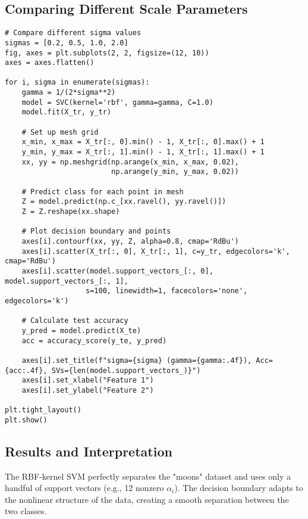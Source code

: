 \documentclass[11pt]{article}
\begin{document}
\subsection{Comparing Different Scale Parameters}
\begin{lstlisting}
# Compare different sigma values
sigmas = [0.2, 0.5, 1.0, 2.0]
fig, axes = plt.subplots(2, 2, figsize=(12, 10))
axes = axes.flatten()

for i, sigma in enumerate(sigmas):
    gamma = 1/(2*sigma**2)
    model = SVC(kernel='rbf', gamma=gamma, C=1.0)
    model.fit(X_tr, y_tr)
    
    # Set up mesh grid
    x_min, x_max = X_tr[:, 0].min() - 1, X_tr[:, 0].max() + 1
    y_min, y_max = X_tr[:, 1].min() - 1, X_tr[:, 1].max() + 1
    xx, yy = np.meshgrid(np.arange(x_min, x_max, 0.02),
                         np.arange(y_min, y_max, 0.02))
    
    # Predict class for each point in mesh
    Z = model.predict(np.c_[xx.ravel(), yy.ravel()])
    Z = Z.reshape(xx.shape)
    
    # Plot decision boundary and points
    axes[i].contourf(xx, yy, Z, alpha=0.8, cmap='RdBu')
    axes[i].scatter(X_tr[:, 0], X_tr[:, 1], c=y_tr, edgecolors='k', cmap='RdBu')
    axes[i].scatter(model.support_vectors_[:, 0], model.support_vectors_[:, 1],
                   s=100, linewidth=1, facecolors='none', edgecolors='k')
    
    # Calculate test accuracy
    y_pred = model.predict(X_te)
    acc = accuracy_score(y_te, y_pred)
    
    axes[i].set_title(f"sigma={sigma} (gamma={gamma:.4f}), Acc={acc:.4f}, SVs={len(model.support_vectors_)}")
    axes[i].set_xlabel("Feature 1")
    axes[i].set_ylabel("Feature 2")

plt.tight_layout()
plt.show()
\end{lstlisting}

\subsection{Results and Interpretation}
The RBF-kernel SVM perfectly separates the "moons" dataset and uses only a handful of support vectors (e.g., 12 nonzero $\alpha_i$). The decision boundary adapts to the nonlinear structure of the data, creating a smooth separation between the two classes.
\end{document}

